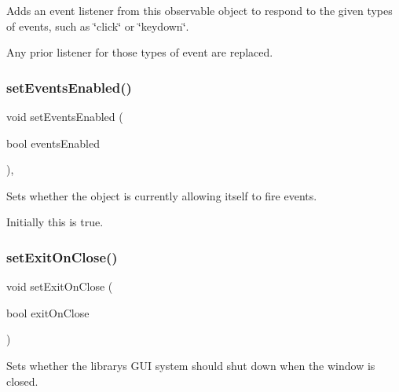 Adds an event listener from this observable object to respond to the given types of events, such as \char`\"{}click\char`\"{} or \char`\"{}keydown\char`\"{}. 

Any prior listener for those types of event are replaced. \mbox{\label{classGObservable_afaa30b2a9e0f378fd1c70d2f1d0b8216}} 
\subsubsection{\texorpdfstring{set\+Events\+Enabled()}{setEventsEnabled()}}
{\footnotesize\ttfamily void set\+Events\+Enabled (\begin{DoxyParamCaption}\item[{bool}]{events\+Enabled }\end{DoxyParamCaption})\hspace{0.3cm}{\ttfamily [virtual]}, {\ttfamily [inherited]}}



Sets whether the object is currently allowing itself to fire events. 

Initially this is true. \mbox{\label{classGWindow_abad01a63e29c19aee274af1b36209838}} 
\subsubsection{\texorpdfstring{set\+Exit\+On\+Close()}{setExitOnClose()}}
{\footnotesize\ttfamily void set\+Exit\+On\+Close (\begin{DoxyParamCaption}\item[{bool}]{exit\+On\+Close }\end{DoxyParamCaption})\hspace{0.3cm}{\ttfamily [virtual]}}



Sets whether the library\textquotesingle{}s G\+UI system should shut down when the window is closed. 

\mbox{\label{classGForwardDrawingSurface_aba081111958a52993a29024a728435df}} 
